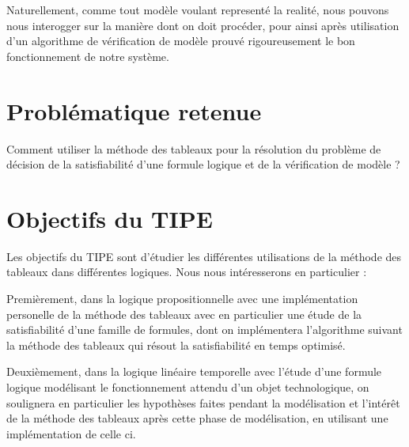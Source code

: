 \documentclass{paper}
\begin{document}
Naturellement, comme tout modèle voulant representé la realité, nous pouvons nous interogger sur la manière dont on doit procéder, pour ainsi après 
utilisation d'un algorithme de vérification de modèle prouvé rigoureusement le bon fonctionnement de notre système.

\section{Problématique retenue}
Comment utiliser la méthode des tableaux pour la résolution du problème de décision de la satisfiabilité d'une formule logique et de la vérification de modèle ?

\section{Objectifs du TIPE}
Les objectifs du TIPE sont d'étudier les différentes utilisations de la méthode des tableaux dans différentes logiques. Nous nous intéresserons en particulier :

Premièrement, dans la logique propositionnelle avec une implémentation personelle de la méthode des tableaux avec en particulier une étude de la satisfiabilité d'une 
famille de formules, dont on implémentera l'algorithme suivant la méthode des tableaux qui résout la satisfiabilité en temps optimisé.

Deuxièmement, dans la logique linéaire temporelle avec l'étude d'une formule logique modélisant le fonctionnement attendu d'un objet technologique, on
soulignera en particulier les hypothèses faites pendant la modélisation et l'intérêt de la méthode des tableaux après cette phase de modélisation, en utilisant
une implémentation de celle ci.
\end{document}
